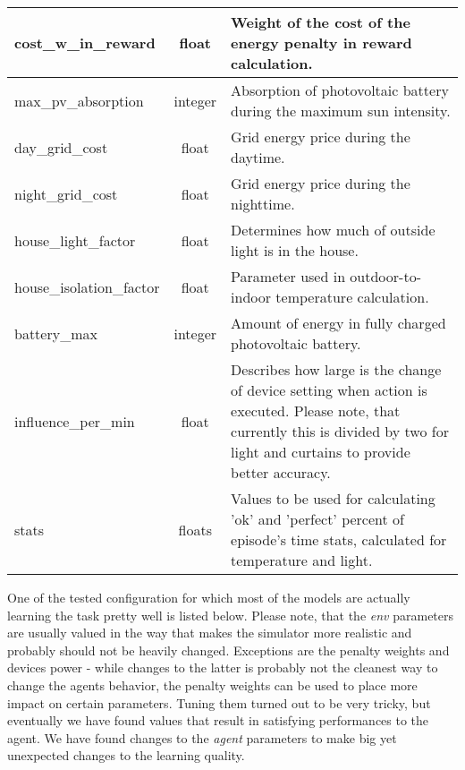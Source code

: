 \documentclass{article}
\begin{document}
{\begin{longtable}{l|c|p{9cm}}
    \hline
    cost\_w\_in\_reward & float & Weight of the cost of the energy penalty in reward calculation.\\
    \hline
    max\_pv\_absorption & integer & Absorption of photovoltaic battery during the maximum sun intensity.\\
    \hline
    day\_grid\_cost & float & Grid energy price during the daytime.\\
    \hline
    night\_grid\_cost & float & Grid energy price during the nighttime.\\
    \hline
    house\_light\_factor & float & Determines how much of outside light is in the house.\\
    \hline
    house\_isolation\_factor & float & Parameter used in outdoor-to-indoor temperature calculation.\\
    \hline
    battery\_max & integer & Amount of energy in fully charged photovoltaic battery.\\
    \hline
    influence\_per\_min & float & Describes how large is the change of device setting when action is executed. Please note, that currently this is divided by two for light and curtains to provide better accuracy.\\
    \hline
    stats & floats & Values to be used for calculating 'ok' and 'perfect' percent of episode's time stats, calculated for temperature and light. 
\end{longtable}}

One of the tested configuration for which most of the models are actually learning the task pretty well is listed below. Please note, that the \textit{env} parameters are usually valued in the way that makes the simulator more realistic and probably should not be heavily changed. Exceptions are the penalty weights and devices power - while changes to the latter is probably not the cleanest way to change the agents behavior, the penalty weights can be used to place more impact on certain parameters. Tuning them turned out to be very tricky, but eventually we have found values that result in satisfying performances to the agent. We have found changes to the \textit{agent} parameters to make big yet unexpected changes to the learning quality. 
\end{document}
